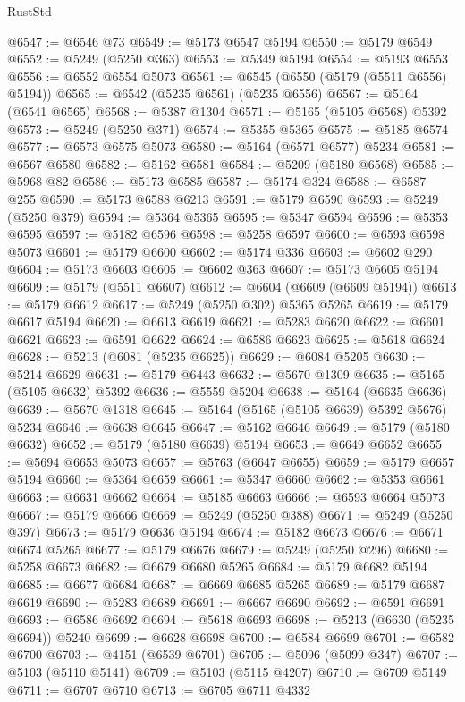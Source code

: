 \begin{lexlean}{RustStd}
\begin{coremodule}
@6547 := @6546 @73
@6549 := @5173 @6547 @5194
@6550 := @5179 @6549
@6552 := @5249 (@5250 @363)
@6553 := @5349 @5194
@6554 := @5193 @6553
@6556 := @6552 @6554 @5073
@6561 := @6545 (@6550 (@5179 (@5511 @6556) @5194))
@6565 := @6542 (@5235 @6561) (@5235 @6556)
@6567 := @5164 (@6541 @6565)
@6568 := @5387 @1304
@6571 := @5165 (@5105 @6568) @5392
@6573 := @5249 (@5250 @371)
@6574 := @5355 @5365
@6575 := @5185 @6574
@6577 := @6573 @6575 @5073
@6580 := @5164 (@6571 @6577) @5234
@6581 := @6567 @6580
@6582 := @5162 @6581
@6584 := @5209 (@5180 @6568)
@6585 := @5968 @82
@6586 := @5173 @6585
@6587 := @5174 @324
@6588 := @6587 @255
@6590 := @5173 @6588 @6213
@6591 := @5179 @6590
@6593 := @5249 (@5250 @379)
@6594 := @5364 @5365
@6595 := @5347 @6594
@6596 := @5353 @6595
@6597 := @5182 @6596
@6598 := @5258 @6597
@6600 := @6593 @6598 @5073
@6601 := @5179 @6600
@6602 := @5174 @336
@6603 := @6602 @290
@6604 := @5173 @6603
@6605 := @6602 @363
@6607 := @5173 @6605 @5194
@6609 := @5179 (@5511 @6607)
@6612 := @6604 (@6609 (@6609 @5194))
@6613 := @5179 @6612
@6617 := @5249 (@5250 @302) @5365 @5265
@6619 := @5179 @6617 @5194
@6620 := @6613 @6619
@6621 := @5283 @6620
@6622 := @6601 @6621
@6623 := @6591 @6622
@6624 := @6586 @6623
@6625 := @5618 @6624
@6628 := @5213 (@6081 (@5235 @6625))
@6629 := @6084 @5205
@6630 := @5214 @6629
@6631 := @5179 @6443
@6632 := @5670 @1309
@6635 := @5165 (@5105 @6632) @5392
@6636 := @5559 @5204
@6638 := @5164 (@6635 @6636)
@6639 := @5670 @1318
@6645 := @5164 (@5165 (@5105 @6639) @5392 @5676) @5234
@6646 := @6638 @6645
@6647 := @5162 @6646
@6649 := @5179 (@5180 @6632)
@6652 := @5179 (@5180 @6639) @5194
@6653 := @6649 @6652
@6655 := @5694 @6653 @5073
@6657 := @5763 (@6647 @6655)
@6659 := @5179 @6657 @5194
@6660 := @5364 @6659
@6661 := @5347 @6660
@6662 := @5353 @6661
@6663 := @6631 @6662
@6664 := @5185 @6663
@6666 := @6593 @6664 @5073
@6667 := @5179 @6666
@6669 := @5249 (@5250 @388)
@6671 := @5249 (@5250 @397)
@6673 := @5179 @6636 @5194
@6674 := @5182 @6673
@6676 := @6671 @6674 @5265
@6677 := @5179 @6676
@6679 := @5249 (@5250 @296)
@6680 := @5258 @6673
@6682 := @6679 @6680 @5265
@6684 := @5179 @6682 @5194
@6685 := @6677 @6684
@6687 := @6669 @6685 @5265
@6689 := @5179 @6687 @6619
@6690 := @5283 @6689
@6691 := @6667 @6690
@6692 := @6591 @6691
@6693 := @6586 @6692
@6694 := @5618 @6693
@6698 := @5213 (@6630 (@5235 @6694)) @5240
@6699 := @6628 @6698
@6700 := @6584 @6699
@6701 := @6582 @6700
@6703 := @4151 (@6539 @6701)
@6705 := @5096 (@5099 @347)
@6707 := @5103 (@5110 @5141)
@6709 := @5103 (@5115 @4207)
@6710 := @6709 @5149
@6711 := @6707 @6710
@6713 := @6705 @6711 @4332

\end{coremodule}
\end{lexlean}
